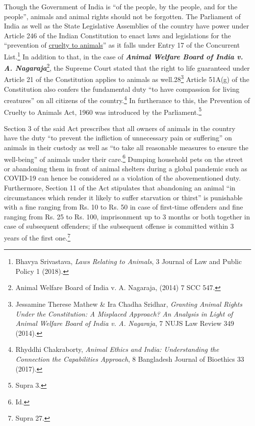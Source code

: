 \begin{multicols}{2}
\noi
Though the Government of India is “of the people, by the people, and for the people”,
animals and animal rights should not be forgotten. The Parliament of India as well as the
State Legislative Assemblies of the country have power under Article 246 of the Indian
Constitution to enact laws and legislations for the “prevention of \underline{cruelty to animals}” as it falls
under Entry 17 of the Concurrent List.\footnote{Bhavya Srivastava, \textit{Laws Relating to Animals}, 3 Journal of Law and Public Policy 1 (2018).} In addition to that, in the case of {\it {\bfseries Animal Welfare
Board of India v. A. Nagaraja}}\footnote{Animal Welfare Board of India v. A. Nagaraja, (2014) 7 SCC 547.}, the Supreme Court stated that the right to life guaranteed
under Article 21 of the Constitution applies to animals as well.28\footnote{Jessamine Therese Mathew \& Ira Chadha Sridhar, \textit{Granting Animal Rights Under the Constitution: A Misplaced Approach? An Analysis in Light of Animal Welfare Board of India v. A. Nagaraja}, 7 NUJS Law Review 349 (2014).} Article 51A(g) of the
Constitution also confers the fundamental duty “to have compassion for living creatures” on
all citizens of the country.\footnote{Rhyddhi Chakraborty, \textit{Animal Ethics and India: Understanding the Connection the Capabilities Approach}, 8
Bangladesh Journal of Bioethics 33 (2017).} In furtherance to this, the Prevention of Cruelty to Animals Act,
1960 was introduced by the Parliament.\footnote{Supra 3.}

\noi
Section 3 of the said Act prescribes that all owners of animals in the country have the duty
“to prevent the infliction of unnecessary pain or suffering” on animals in their custody as well
as “to take all reasonable measures to ensure the well-being” of animals under their care.\footnote{Id.}
Dumping household pets on the street or abandoning them in front of animal shelters during a
global pandemic such as COVID-19 can hence be considered as a violation of the abovementioned duty. Furthermore, Section 11 of the Act stipulates that abandoning an animal “in
circumstances which render it likely to suffer starvation or thirst” is punishable with a fine
ranging from Rs. 10 to Rs. 50 in case of first-time offenders and fine ranging from Rs. 25 to Rs. 100, imprisonment up to 3 months or both together in case of subsequent offenders; if the
subsequent offense is committed within 3 years of the first one.\footnote{Supra 27.}


\end{multicols}
